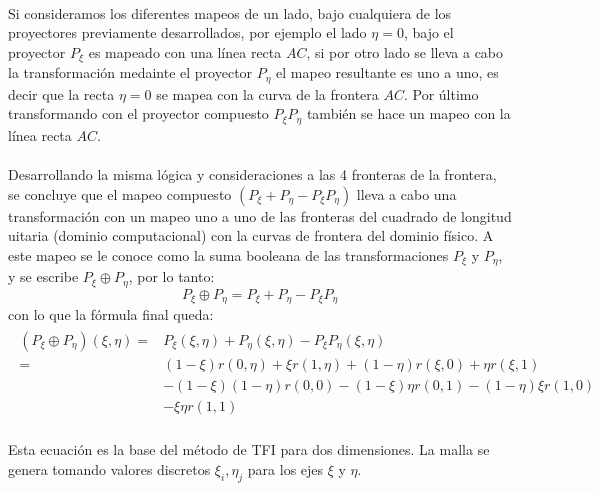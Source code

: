 \documentclass[letterpaper, openright, 12pt]{book}
\begin{document}
    \paragraph*{}
    Si consideramos los diferentes mapeos de un lado, bajo cualquiera de los
    proyectores previamente desarrollados, por ejemplo el lado $\eta = 0$,
    bajo el proyector $P_{\xi}$ es mapeado con una línea recta $AC$, si por
    otro lado se lleva a cabo la transformación medainte el proyector
    $P_{\eta}$ el mapeo resultante es uno a uno, es decir que la recta
    $\eta = 0$ se mapea con la curva de la frontera $AC$. Por último
    transformando con el proyector compuesto $P_{\xi}P_{\eta}$ también se
    hace un mapeo con la línea recta $AC$.

    \paragraph*{}
    Desarrollando la misma lógica y consideraciones a las 4 fronteras de la
    frontera, se concluye que el mapeo compuesto $(P_{\xi} + P_{\eta} - P_{\xi}P_{\eta})$
    lleva a cabo una transformación con un mapeo uno  a uno de las fronteras
    del cuadrado de longitud uitaria (dominio computacional) con la curvas
    de frontera del dominio físico. A este mapeo se le conoce como la suma
    booleana de las transformaciones $P_{\xi}$ y $P_{\eta}$, y se escribe
    $P_{\xi}\oplus P_{\eta}$, por lo tanto:
    \begin{equation}
        P_{\xi}\oplus P_{\eta} = P_{\xi} + P_{\eta} - P_{\xi} P_{\eta}
    \end{equation}
    con lo que la fórmula final queda:
    \begin{align}
        \begin{aligned}
            \left( P_{\xi}\oplus P_{\eta} \right)(\xi, \eta) =& P_{\xi}(\xi, \eta) + P_{\eta}(\xi, \eta) - P_{\xi}P_{\eta}(\xi, \eta) \\
            =& (1 - \xi)r(0, \eta) + \xi r(1, \eta) + (1 - \eta)r(\xi, 0) + \eta r(\xi, 1) \\&- (1-\xi)(1 - \eta)r(0, 0) - (1 - \xi)\eta r(0, 1) - (1- \eta)\xi r(1, 0) \\& - \xi \eta r(1,1)
        \end{aligned}
    \end{align}

    \paragraph*{}
    Esta ecuación es la base del método de TFI para dos dimensiones. La
    malla se genera tomando valores discretos $\xi_{i}, \eta_{j}$ para
    los ejes $\xi$ y $\eta$.
\end{document}
